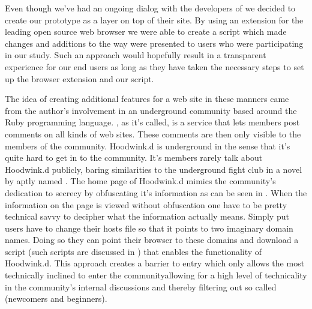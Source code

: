 Even though we've had an ongoing dialog with the developers of \urort we
decided to create our prototype as a layer on top of their site.
By using an
extension
for the leading open source%
web browser we were able to create a script which
made changes and additions to the way \urort
were presented to users who were participating in our study.
Such an approach would hopefully result in a transparent experience for our
end users as long as they have taken the necessary steps to set up the browser
extension and our script.

The idea of creating additional features for a web site in these manners
came from the author's involvement in an underground community based around
the Ruby%
programming language. %
,
as it's called, is a service that lets members post comments on all kinds of
web sites. These comments are then only visible to the members of the
community.
Hoodwink.d is underground in the sense that it's quite hard to get in to
the community. It's members rarely talk about Hoodwink.d publicly, baring
similarities to the underground fight club in a novel by \citet{palahniuk96}
aptly named %
.
The home page of Hoodwink.d mimics the community's dedication to secrecy
by obfuscating it's information as can be seen in
.
When the information on the page is viewed without obfuscation%
one have to be pretty technical savvy to decipher what the information 
actually means. Simply put users have to change their hosts file
so that it points to two imaginary domain names. Doing so they can point their
browser to these domains and download a script (such scripts are discussed in
)
that enables the functionality
of Hoodwink.d.%
This approach creates a barrier to entry which only allows the most
technically inclined to enter the community\dash{}allowing for a
high level of technicality in the community's internal discussions
and thereby filtering out so called 
(newcomers and beginners).

